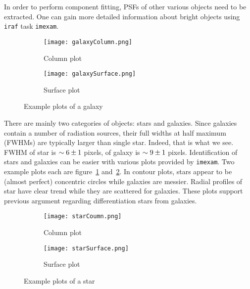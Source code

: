 In order to perform component fitting, PSFs of other various objects need to be extracted. One can gain more detailed information about bright objects using \verb|iraf| task \verb|imexam|. 

\begin{figure}[ht]
   \centering
   \begin{subfigure}[t]{0.5\textwidth}
   \begin{center}
   \texttt{[image: galaxyColumn.png]}
   \end{center}
   \caption{Column plot}
   \end{subfigure}%
   \begin{subfigure}[t]{0.5\textwidth}
   \begin{center}
   \texttt{[image: galaxySurface.png]}
   \end{center}
   \caption{Surface plot}
   \end{subfigure}
   \caption{Example plots of a galaxy}%
   \label{fig:galaxyPlots}
\end{figure}

There are mainly two categories of objects: stars and galaxies. Since galaxies contain a number of radiation sources, their full widths at half maximum (FWHMs) are typically larger than single star. Indeed, that is what we see. FWHM of star is $\sim\num{6+-1}$ pixels, of galaxy is $\sim\num{9+-1}$ pixels. Identification of stars and galaxies can be easier with various plots provided by \verb|imexam|. Two example plots each are figure~\ref{fig:galaxyPlots} and~\ref{fig:starPlots}. In contour plots, stars appear to be (almost perfect) concentric circles while galaxies are messier. Radial profiles of star have clear trend while they are scattered for galaxies. These plots support previous argument regarding differentiation stars from galaxies.
\begin{figure}[ht]
   \centering
   \begin{subfigure}[t]{0.5\textwidth}
   \begin{center}
   \texttt{[image: starCoumn.png]}
   \end{center}
   \caption{Column plot}
   \end{subfigure}%
   \begin{subfigure}[t]{0.5\textwidth}
   \begin{center}
   \texttt{[image: starSurface.png]}
   \end{center}
   \caption{Surface plot}
   \end{subfigure}
   \caption{Example plots of a star}%
   \label{fig:starPlots}
\end{figure}

